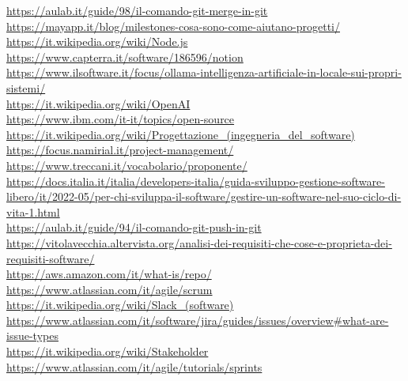 \begin{small}
\begin{multicols*}{2}
\url{https://aulab.it/guide/98/il-comando-git-merge-in-git}\\
\url{https://mayapp.it/blog/milestones-cosa-sono-come-aiutano-progetti/}\\
\url{https://it.wikipedia.org/wiki/Node.js}\\
\url{https://www.capterra.it/software/186596/notion}\\
\url{https://www.ilsoftware.it/focus/ollama-intelligenza-artificiale-in-locale-sui-propri-sistemi/}\\
\url{https://it.wikipedia.org/wiki/OpenAI}\\
\url{https://www.ibm.com/it-it/topics/open-source}\\
\url{https://it.wikipedia.org/wiki/Progettazione_(ingegneria_del_software)}\\
\url{https://focus.namirial.it/project-management/}\\
\url{https://www.treccani.it/vocabolario/proponente/}\\
\url{https://docs.italia.it/italia/developers-italia/guida-sviluppo-gestione-software-libero/it/2022-05/per-chi-sviluppa-il-software/gestire-un-software-nel-suo-ciclo-di-vita-1.html}\\
\url{https://aulab.it/guide/94/il-comando-git-push-in-git}\\
\url{https://vitolavecchia.altervista.org/analisi-dei-requisiti-che-cose-e-proprieta-dei-requisiti-software/}\\
\url{https://aws.amazon.com/it/what-is/repo/}\\
\url{https://www.atlassian.com/it/agile/scrum}\\
\url{https://it.wikipedia.org/wiki/Slack_(software)}\\
\url{https://www.atlassian.com/it/software/jira/guides/issues/overview#what-are-issue-types}\\
\url{https://it.wikipedia.org/wiki/Stakeholder}\\
\url{https://www.atlassian.com/it/agile/tutorials/sprints}\\


\end{multicols*}
\end{small}

